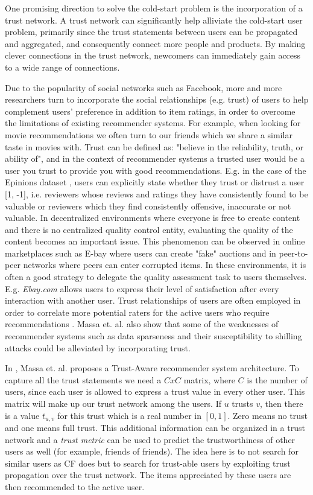 One promising direction to solve the cold-start problem is the incorporation of a trust network. A trust network can significantly help alliviate the cold-start user problem, primarily since the trust statements between users can be propagated and aggregated, and consequently connect more people and products. By making clever connections in the trust network, newcomers can immediately gain access to a wide range of connections.

Due to the popularity of social networks such as Facebook, more and more
researchers turn to incorporate the social relationships (e.g. trust) of users
to help complement users’ preference in addition to item ratings, in order to overcome the limitations of existing recommender systems. For example, when looking for movie recommendations we often turn to our friends which we share a similar taste in movies with. Trust can be defined as: "believe in the reliability, truth, or ability of", and in the context of recommender systems a trusted user would be a user you trust to provide you with good recommendations. E.g. in the case of the Epinions dataset \cite{Epinions}, users can explicitly state whether they trust or distrust a user [1, -1], i.e. reviewers whose reviews and ratings they have consistently found to be valuable or reviewers which they find consistently offensive, inaccurate or not valuable. In decentralized environments where everyone is free to create content and there
is no centralized quality control entity, evaluating the quality of the content becomes an important issue. This phenomenon can be observed in online
marketplaces such as E-bay where users can create "fake" auctions and in peer-to-peer networks where peers can enter corrupted items. In these environments, it is often a good strategy to delegate the quality assessment task to users themselves. E.g. \emph{Ebay.com} allows users to express their level of satisfaction after every interaction with another user. Trust relationships of users are often employed in order to correlate more potential raters for the active users who require recommendations \cite{Massa2004, Massa2007}. Massa et. al. \cite{Massa2004} also show that some of the weaknesses of recommender systems such as data sparseness and their susceptibility to shilling attacks could be alleviated by incorporating trust.

In \cite{Massa2004}, Massa et. al. proposes a Trust-Aware recommender system architecture.
To capture all the trust statements we need a $CxC$ matrix, where $C$ is the number of users, since each user is allowed to express a trust value in every other user. This matrix will make up our trust network among the users. If $u$
trusts $v$, then there is a value $t_{u,v}$ for this trust which is a real
number in $[0,1]$. Zero means no trust and one means full trust. This additional information can be organized in a trust network and a \emph{trust metric} can be used to predict the trustworthiness of other users as well (for example, friends of friends). The idea here is to not search for similar users as CF does but to search for trust-able users by exploiting trust propagation over the trust network. The items appreciated by these users are then recommended to the active user.

